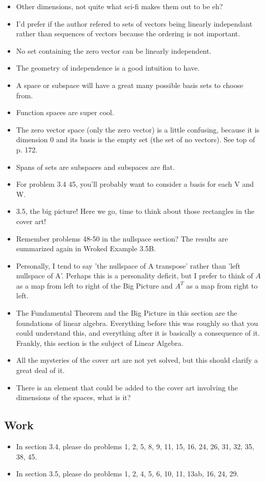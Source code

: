 		\begin{itemize}
			\item Other dimensions, not quite what sci-fi makes them out to be eh?
			\item I'd prefer if the author refered to sets of vectors being linearly independant rather than sequences of vectors because the ordering is not important.
			\item No set containing the zero vector can be linearly independent.
			\item The geometry of independence is a good intuition to have.
			\item A space or subspace will have a great many possible basis sets to choose from.
			\item Function spaces are super cool.
			\item The zero vector space (only the zero vector) is a little confusing, because it is dimension 0 and its basis is the empty set (the set of no vectors). See top of p. 172.
			\item Spans of sets are subspaces and subspaces are flat.
			\item For problem 3.4 45, you'll probably want to consider a basis for each V and W.
			\item 3.5, the big picture! Here we go, time to think about those rectangles in the cover art!
			\item Remember problems 48-50 in the nullspace section? The results are summarized again in Wroked Example 3.5B.
			\item Personally, I tend to say 'the nullspace of A transpose' rather than 'left nullspace of A'. Perhaps this is a personality deficit, but I prefer to think of $A$ as a map from left to right of the Big Picture and $A^T$ as a map from right to left.
			\item The Fundamental Theorem and the Big Picture in this section are the foundations of linear algebra. Everything before this was roughly so that you could understand this, and everything after it is basically a consequence of it. Frankly, this section is the subject of Linear Algebra.
			\item All the mysteries of the cover art are not yet solved, but this should clarify a great deal of it.
			\item There is an element that could be added to the cover art involving the dimensions of the spaces, what is it?
		\end{itemize}

	\subsection{Work}
		\begin{itemize}
			\item In section 3.4, please do problems 1, 2, 5, 8, 9, 11, 15, 16, 24, 26, 31, 32, 35, 38, 45.
			\item In section 3.5, please do problems 1, 2, 4, 5, 6, 10, 11, 13ab, 16, 24, 29.
		\end{itemize}


